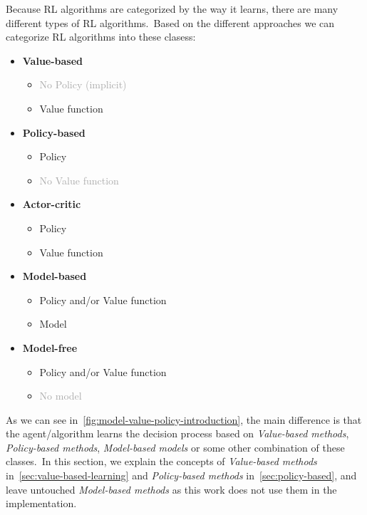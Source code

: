 \documentclass[../xlapes02]{subfiles}
\begin{document}
    Because RL algorithms are categorized by the way it learns, there are many different types of RL algorithms.\ Based on the different approaches we can categorize RL algorithms into these clasess:
    \begin{multicols}{2}
        \begin{itemize}
            \item \textbf{Value-based}
            \begin{itemize}
                \item \textcolor{darkgray}{No Policy (implicit)}
                \item Value function
            \end{itemize}
            \item \textbf{Policy-based}
            \begin{itemize}
                \item Policy
                \item \textcolor{darkgray}{No Value function}
            \end{itemize}
            \item \textbf{Actor-critic}
            \begin{itemize}
                \item Policy
                \item Value function
            \end{itemize}
        \end{itemize}
        \columnbreak
        \begin{itemize}
            \item \textbf{Model-based}
            \begin{itemize}
                \item Policy and/or Value function
                \item Model
            \end{itemize}
            \item \textbf{Model-free}
            \begin{itemize}
                \item Policy and/or Value function
                \item \textcolor{darkgray}{No model}
            \end{itemize}
        \end{itemize}
    \end{multicols}

    As we can see in~\cref{fig:model-value-policy-introduction}, the main difference is that the agent/algorithm learns the decision process based on \emph{Value-based methods}, \emph{Policy-based methods}, \emph{Model-based models} or some other combination of these classes.\ In this section, we explain the concepts of \emph{Value-based methods} in~\cref{sec:value-based-learning} and \emph{Policy-based methods} in~\cref{sec:policy-based}, and leave untouched \emph{Model-based methods} as this work does not use them in the implementation.
\end{document}
